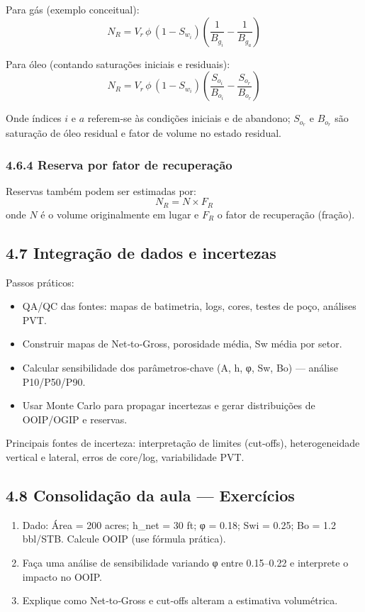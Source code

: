 \documentclass[11pt,a4paper]{article}
\begin{document}
Para gás (exemplo conceitual):
$$
N_R = V_r\,\phi\,(1-S_{w_i})\left(\frac{1}{B_{g_i}} - \frac{1}{B_{g_a}}\right)
$$

Para óleo (contando saturações iniciais e residuais):
$$
N_R = V_r\,\phi\,(1-S_{w_i})\left(\frac{S_{o_i}}{B_{o_i}} - \frac{S_{o_r}}{B_{o_r}}\right)
$$

Onde índices $i$ e $a$ referem‑se às condições iniciais e de abandono; $S_{o_r}$ e $B_{o_r}$ são saturação de óleo residual e fator de volume no estado residual.

\subsubsection{4.6.4 Reserva por fator de recuperação}
Reservas também podem ser estimadas por:
$$
N_R = N \times F_R
$$
onde $N$ é o volume originalmente em lugar e $F_R$ o fator de recuperação (fração).

\subsection{4.7 Integração de dados e incertezas}
Passos práticos:
\begin{itemize}
\item QA/QC das fontes: mapas de batimetria, logs, cores, testes de poço, análises PVT.
\item Construir mapas de Net‑to‑Gross, porosidade média, Sw média por setor.
\item Calcular sensibilidade dos parâmetros-chave (A, h, φ, Sw, Bo) — análise P10/P50/P90.
\item Usar Monte Carlo para propagar incertezas e gerar distribuições de OOIP/OGIP e reservas.
\end{itemize}

Principais fontes de incerteza: interpretação de limites (cut‑offs), heterogeneidade vertical e lateral, erros de core/log, variabilidade PVT.

\subsection{4.8 Consolidação da aula — Exercícios}
\begin{enumerate}
\item Dado: Área = 200 acres; h_net = 30 ft; φ = 0.18; Swi = 0.25; Bo = 1.2 bbl/STB. Calcule OOIP (use fórmula prática).
\item Faça uma análise de sensibilidade variando φ entre 0.15–0.22 e interprete o impacto no OOIP.
\item Explique como Net‑to‑Gross e cut‑offs alteram a estimativa volumétrica.
\end{enumerate}
\end{document}
